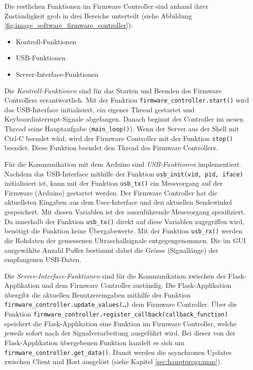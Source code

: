 Die restlichen Funktionen im Firmware Controller sind anhand ihrer Zuständigkeit grob in drei Bereiche unterteilt (siehe Abbildung \ref{fig:image_software_firmware_controller}):

\begin{itemize}
	\item Kontroll-Funktionen
	\item USB-Funktionen
	\item Server-Interface-Funktionen
\end{itemize}

Die \textit{Kontroll-Funktionen} sind für das Starten und Beenden des Firmware Controllers verantwortlich. Mit der Funktion \texttt{firmware\_controller.start()} wird das USB-Interface initialisiert, ein eigener Thread gestartet und Keyboardinterrupt-Signale abgefangen. Danach beginnt der Controller im neuen Thread seine Hauptaufgabe (\texttt{main\_loop()}).
Wenn der Server aus der Shell mit Ctrl-C beendet wird, wird der Firmware Controller mit der Funktion \texttt{stop()} beendet. Diese Funktion beendet den Thread des Firmware Controllers.

Für die Kommunikation mit dem Arduino sind \textit{USB-Funktionen} implementiert. Nachdem das USB-Interface mithilfe der Funktion \texttt{usb\_init(vid, pid, iface)} initialisiert ist, kann mit der Funktion \texttt{usb\_tx()} ein Messvorgang auf der Firmware (Arduino) gestartet werden. Der Firmware Controller hat die aktuellsten Eingaben aus dem User-Interface und den aktuellen Sendewinkel gespeichert. Mit diesen Variablen ist der auszuführende Messvorgang spezifiziert. Da innerhalb der Funktion \texttt{usb\_tx()} direkt auf diese Variablen zugegriffen wird, benötigt die Funktion keine Übergabewerte. Mit der Funktion \texttt{usb\_rx()} werden die Rohdaten der gemessenen Ultraschallsignale entgegengenommen. Die im GUI ausgewählte Anzahl Puffer bestimmt dabei die Grösse (Signallänge) der empfangenen USB-Daten.

Die \textit{Server-Interface-Funktionen} sind für die Kommunikation zwischen der Flask-Applikation und dem Firmware Controller zuständig. Die Flask-Applikation übergibt die aktuellen Benutzereingaben mithilfe der Funktion \texttt{firmware\_controller.update\_values(\dots)} dem Firmware Controller.
Über die Funktion \texttt{firmware\_controller.register\_callback(callback\_function)} speichert die Flask-Applikation eine Funktion im Firmware Controller, welche jeweils sofort nach der Signalverarbeitung ausgeführt wird. Bei dieser von der Flask-Applikation übergebenen Funktion handelt es sich um \texttt{firmware\_controller.get\_data()}. Damit werden die asynchronen Updates zwischen Client und Host ausgelöst (siehe Kapitel \ref{sec:hauptprogramm}).

